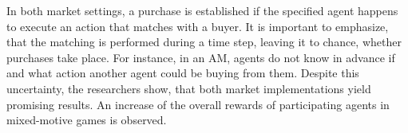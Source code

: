 In both market settings, a purchase is established if the specified agent happens to execute an action that matches with a buyer. It is important to emphasize, that the matching is performed during a time step, leaving it to chance, whether purchases take place. For instance, in an AM, agents do not know in advance if and what action another agent could be buying from them. Despite this uncertainty, the researchers show, that both market implementations yield promising results. An increase of the overall rewards of participating agents in mixed-motive games is observed.

